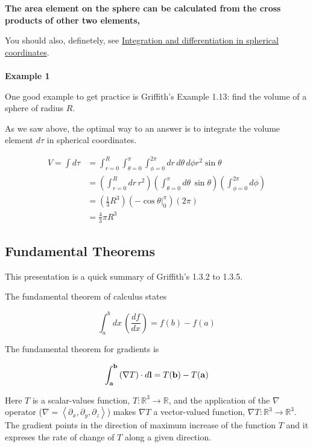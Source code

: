 \textbf{The area element on the sphere can be calculated from the cross products of other two elements,}

You should also, definetely, see
\href{https://en.wikipedia.org/wiki/Spherical_coordinate_system#Integration_and_differentiation_in_spherical_coordinates}{Integration and differentiation in spherical coordinates}.
\\~\\


\textbf{Example 1}

One good example to get practice is Griffith's Example 1.13: find the volume of a sphere of radius $R$.

As we saw above, the optimal way to an answer is to integrate the volume element $d\tau$ in spherical coordinates.

\begin{align*}
V = \int d\tau &=
\int_{r=0}^{R} \int_{\theta=0}^{\pi} \int_{\phi=0}^{2\pi} dr \, d\theta \, d\phi r^2 \sin\theta \\
&=  \left( \int_{r=0}^{R} dr \,r^2 \right)
    \left( \int_{\theta=0}^{\pi} d\theta \, \sin\theta \right)
    \left( \int_{\phi=0}^{2\pi} d\phi \right) \\
&= \left( \frac{1}{3} R^3 \right) \left( -\cos\theta \Big|_{0}^{\pi} \right) \left( 2\pi \right) \\
&= \frac{4}{3} \pi R^3
\end{align*}



\subsection{Fundamental Theorems}

This presentation is a quick summary of Griffith's 1.3.2 to 1.3.5.

The fundamental theorem of calculus states

$$
\int_{a}^{b} dx \, \left(\frac{df}{dx}\right) = f(b) - f(a)
$$

The fundamental theorem for gradients is

$$
\int_{\boldsymbol{\mathbf{a}}}^{\boldsymbol{\mathbf{b}}} \left(\nabla T\right) \cdot d\boldsymbol{\mathbf{l}}
= T(\boldsymbol{\mathbf{b}}) - T(\boldsymbol{\mathbf{a}})
$$

Here $T$ is a scalar-values function, $T : \mathbb{R}^3 \rightarrow \mathbb{R}$, and the application of the
$\nabla$ operator ($\nabla = \left< \partial_x, \partial_y, \partial_z \right>$) makes $\nabla T$ a vector-valued function,
$\nabla T : \mathbb{R}^3 \rightarrow \mathbb{R}^3$.
The gradient points in the direction of maximum increase of the function $T$ and it expreses the rate of change of $T$
along a given direction.

